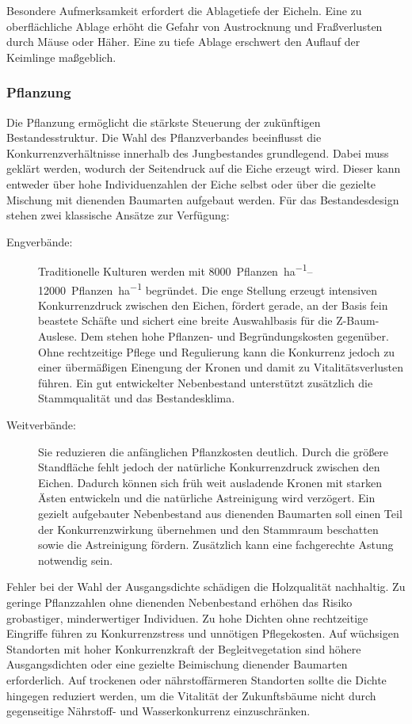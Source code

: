 \documentclass[twocolumn, bibliography=totoc, abstract=true]{scrartcl}
\begin{document}
Besondere Aufmerksamkeit erfordert die Ablagetiefe der Eicheln. Eine zu oberflächliche Ablage erhöht die Gefahr von Austrocknung und Fraßverlusten durch Mäuse oder Häher. Eine zu tiefe Ablage erschwert den Auflauf der Keimlinge maßgeblich.

\subsubsection{Pflanzung}

Die Pflanzung ermöglicht die stärkste Steuerung der zukünftigen Bestandesstruktur. Die Wahl des Pflanzverbandes beeinflusst die Konkurrenzverhältnisse innerhalb des Jungbestandes grundlegend. Dabei muss geklärt werden, wodurch der Seitendruck auf die Eiche erzeugt wird. Dieser kann entweder über hohe Individuenzahlen der Eiche selbst oder über die gezielte Mischung mit dienenden Baumarten aufgebaut werden. Für das Bestandesdesign stehen zwei klassische Ansätze zur Verfügung:

\begin{description}
\item[Engverbände:] Traditionelle Kulturen werden mit \qtyrange{8000}{12000}{Pflanzen\per\hectare} begründet. Die enge Stellung erzeugt intensiven Konkurrenzdruck zwischen den Eichen, fördert gerade, an der Basis fein beastete Schäfte und sichert eine breite Auswahlbasis für die Z-Baum-Auslese. Dem stehen hohe Pflanzen- und Begründungskosten gegenüber. Ohne rechtzeitige Pflege und Regulierung kann die Konkurrenz jedoch zu einer übermäßigen Einengung der Kronen und damit zu Vitalitätsverlusten führen. Ein gut entwickelter Nebenbestand unterstützt zusätzlich die Stammqualität und das Bestandesklima.
\item[Weitverbände:] Sie reduzieren die anfänglichen Pflanzkosten deutlich. Durch die größere Standfläche fehlt jedoch der natürliche Konkurrenzdruck zwischen den Eichen. Dadurch können sich früh weit ausladende Kronen mit starken Ästen entwickeln und die natürliche Astreinigung wird verzögert. Ein gezielt aufgebauter Nebenbestand aus dienenden Baumarten soll einen Teil der Konkurrenzwirkung übernehmen und den Stammraum beschatten sowie die Astreinigung fördern. Zusätzlich kann eine fachgerechte Astung notwendig sein.
\end{description}

Fehler bei der Wahl der Ausgangsdichte schädigen die Holzqualität nachhaltig. Zu geringe Pflanzzahlen ohne dienenden Nebenbestand erhöhen das Risiko grobastiger, minderwertiger Individuen. Zu hohe Dichten ohne rechtzeitige Eingriffe führen zu Konkurrenzstress und unnötigen Pflegekosten. Auf wüchsigen Standorten mit hoher Konkurrenzkraft der Begleitvegetation sind höhere Ausgangsdichten oder eine gezielte Beimischung dienender Baumarten erforderlich. Auf trockenen oder nährstoffärmeren Standorten sollte die Dichte hingegen reduziert werden, um die Vitalität der Zukunftsbäume nicht durch gegenseitige Nährstoff- und Wasserkonkurrenz einzuschränken.
\end{document}
